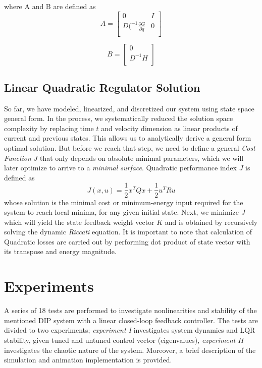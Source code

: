 \documentclass[journal]{IEEEtran}
\begin{document}
where A and B are defined as
\begin{equation}
    A =
\begin{bmatrix}
        0 & I \\
        D(^{-1} \frac{\partial G}{\partial q} & 0 \\
\end{bmatrix}
\end{equation}

\begin{equation}
    B =
\begin{bmatrix}
    0 \\
    D^{-1} H\\
    \end{bmatrix}
    \end{equation}


\subsection{Linear Quadratic Regulator Solution}
So far, we have modeled, linearized, and discretized our system using state
space general form. In the process, we systematically reduced the solution space
complexity by replacing time \(t\) and velocity dimension as linear products of
current and previous states. This allows us to analytically derive a general
form optimal solution. But before we reach that step, we need to define a
general \emph{Cost Function} \(J\) that only depends on absolute minimal parameters,
which we will later optimize to arrive to a \emph{minimal surface}. Quadratic
performance index \(J \) is
defined as
\begin{equation}
J(x,u) = \frac{1}{2}x^{T}Q x + \frac{1}{2}u^{T}Ru
\end{equation}
whose solution is the minimal cost or minimum-energy input required for the
system to reach local minima, for any given initial state. Next, we minimize \(J\)
which will yield the state feedback weight vector \(K\) and is obtained by
recursively solving the dynamic \emph{Riccati} equation.
It is important to note that calculation of Quadratic losses are carried out by
performing dot product of state vector with its transpose and energy magnitude.



\section{Experiments}
A series of 18 tests are performed to investigate nonlinearities and stability
of the mentioned DIP system with a linear closed-loop feedback controller. The
tests are divided to two experiments; \emph{experiment I} investigates system
dynamics and LQR stability, given tuned and untuned control vector (eigenvalues),
\emph{experiment II} investigates the chaotic nature of the system. Moreover, a
brief description of the simulation and animation implementation is provided.
\end{document}
